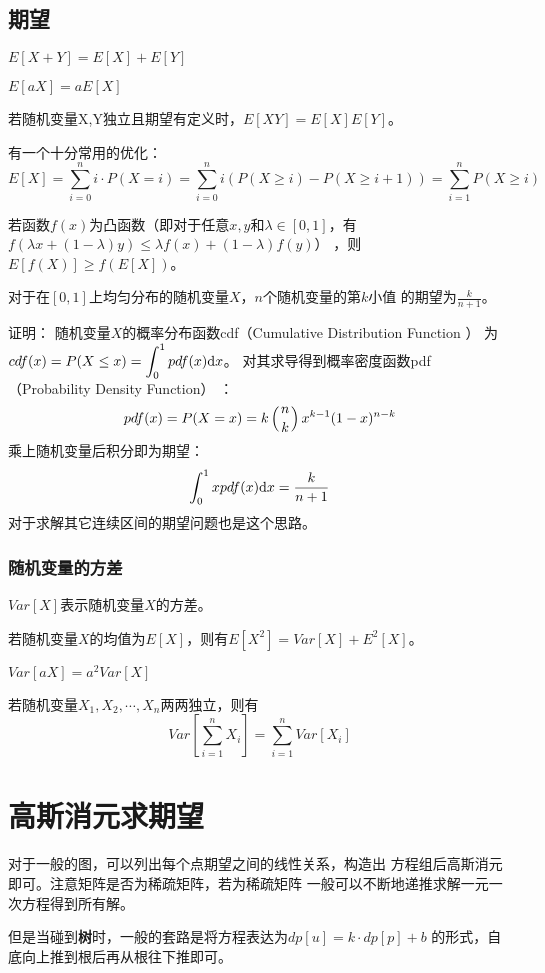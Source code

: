 \subsection{期望}
\begin{theorem}[期望的线性性质]
    $E[X+Y]=E[X]+E[Y]$
\end{theorem}
\begin{theorem}
    $E[aX]=aE[X]$
\end{theorem}
\begin{theorem}
    若随机变量X,Y独立且期望有定义时，$E[XY]=E[X]E[Y]$。
\end{theorem}
有一个十分常用的优化：
\begin{displaymath}
    E[X]=\sum_{i=0}^n{i\cdot P(X=i)}
    =\sum_{i=0}^n{i(P(X\geq i)-P(X\geq i+1))}
    =\sum_{i=1}^n{P(X\geq i)}
\end{displaymath}
\begin{theorem}
    若函数$f(x)$为凸函数（即对于任意$x,y$和$\lambda\in [0,1]$，有
    $f(\lambda x+(1-\lambda)y)\leq\lambda f(x)+(1-\lambda)f(y)$）
    ，则$E[f(X)]\geq f(E[X])$。
\end{theorem}
\begin{theorem}
    对于在$[0,1]$上均匀分布的随机变量$X$，$n$个随机变量的第$k$小值
    的期望为$\frac{k}{n+1}$。
\end{theorem}
证明：
随机变量$X$的概率分布函数cdf（Cumulative Distribution Function
）
为$\displaystyle cdf(x)=P(X\leq x)=\int_0^1{pdf(x)\mathrm{d} x}$。
对其求导得到概率密度函数pdf（Probability Density Function）
：
\begin{displaymath}
    pdf(x)=P(X=x)=k\left(n \atop k\right)x^{k-1}(1-x)^{n-k}
\end{displaymath}
乘上随机变量后积分即为期望：
\begin{displaymath}
    \int_0^1{xpdf(x)\mathrm{d} x}=\frac{k}{n+1}
\end{displaymath}
对于求解其它连续区间的期望问题也是这个思路。
\subsubsection{随机变量的方差}
$Var[X]$表示随机变量$X$的方差。
\begin{theorem}
    若随机变量$X$的均值为$E[X]$，则有$E[X^2]=Var[X]+E^2[X]$。
\end{theorem}
\begin{theorem}
    $Var[aX]=a^2Var[X]$
\end{theorem}
\begin{theorem}
    若随机变量$X_1,X_2,\cdots,X_n$两两独立，则有
    \begin{displaymath}
        Var[\sum_{i=1}^n{X_i}]=\sum_{i=1}^n{Var[X_i]}
    \end{displaymath}
\end{theorem}
\section{高斯消元求期望}
对于一般的图，可以列出每个点期望之间的线性关系，构造出
方程组后高斯消元即可。注意矩阵是否为稀疏矩阵，若为稀疏矩阵
一般可以不断地递推求解一元一次方程得到所有解。

但是当碰到{\bfseries 树}时，一般的套路是将方程表达为$dp[u]=k\cdot dp[p]+b$
的形式，自底向上推到根后再从根往下推即可。
